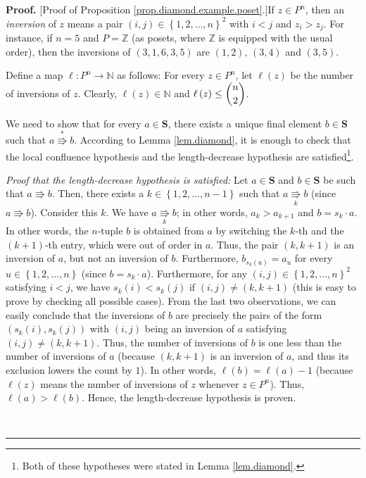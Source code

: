 \documentclass[numbers=enddot,12pt,final,onecolumn,notitlepage]{scrartcl}%
\theoremstyle{definition}
\newenvironment{proof}[1][Proof]{\noindent\textbf{#1.} }{\ \rule{0.5em}{0.5em}}
\newenvironment{vershort}{}{}
\begin{document}
\begin{proof}
[Proof of Proposition \ref{prop.diamond.example.poset}.]If $z\in P^{n}$, then
an \textit{inversion} of $z$ means a pair $\left(  i,j\right)  \in\left\{
1,2,\ldots,n\right\}  ^{2}$ with $i<j$ and $z_{i}>z_{j}$. For instance, if
$n=5$ and $P=\mathbb{Z}$ (as posets, where $\mathbb{Z}$ is equipped with the
usual order), then the inversions of $\left(  3,1,6,3,5\right)  $ are $\left(
1,2\right)  $, $\left(  3,4\right)  $ and $\left(  3,5\right)  $.

Define a map $\ell:P^{n}\rightarrow\mathbb{N}$ as follows: For every $z\in
P^{n}$, let $\ell\left(  z\right)  $ be the number of inversions of $z$.
Clearly, $\ell\left(  z\right)  \in\mathbb{N}$ and $\ell\left(  z\right)
\leq\dbinom{n}{2}$.

We need to show that for every $a\in\mathbf{S}$, there exists a unique final
element $b\in\mathbf{S}$ such that $a\overset{\ast}{\Rrightarrow}b$. According
to Lemma \ref{lem.diamond}, it is enough to check that the local confluence
hypothesis and the length-decrease hypothesis are satisfied\footnote{Both of
these hypotheses were stated in Lemma \ref{lem.diamond}.}.

\begin{vershort}
\textit{Proof that the length-decrease hypothesis is satisfied:} Let
$a\in\mathbf{S}$ and $b\in\mathbf{S}$ be such that $a\Rrightarrow b$. Then,
there exists a $k\in\left\{  1,2,\ldots,n-1\right\}  $ such that
$a\underset{k}{\Rrightarrow}b$ (since $a\Rrightarrow b$). Consider this $k$.
We have $a\underset{k}{\Rrightarrow}b$; in other words, $a_{k}>a_{k+1}$ and
$b=s_{k}\cdot a$. In other words, the $n$-tuple $b$ is obtained from $a$ by
switching the $k$-th and the $\left(  k+1\right)  $-th entry, which were out
of order in $a$. Thus, the pair $\left(  k,k+1\right)  $ is an inversion of
$a$, but not an inversion of $b$. Furthermore, $b_{s_{k}\left(  u\right)
}=a_{u}$ for every $u\in\left\{  1,2,\ldots,n\right\}  $ (since $b=s_{k}\cdot
a$). Furthermore, for any $\left(  i,j\right)  \in\left\{  1,2,\ldots
,n\right\}  ^{2}$ satisfying $i<j$, we have $s_{k}\left(  i\right)
<s_{k}\left(  j\right)  $ if $\left(  i,j\right)  \neq\left(  k,k+1\right)  $
(this is easy to prove by checking all possible cases). From the last two
observations, we can easily conclude that the inversions of $b$ are precisely
the pairs of the form $\left(  s_{k}\left(  i\right)  ,s_{k}\left(  j\right)
\right)  $ with $\left(  i,j\right)  $ being an inversion of $a$ satisfying
$\left(  i,j\right)  \neq\left(  k,k+1\right)  $. Thus, the number of
inversions of $b$ is one less than the number of inversions of $a$ (because
$\left(  k,k+1\right)  $ is an inversion of $a$, and thus its exclusion lowers
the count by $1$). In other words, $\ell\left(  b\right)  =\ell\left(
a\right)  -1$ (because $\ell\left(  z\right)  $ means the number of inversions
of $z$ whenever $z\in P^{n}$). Thus, $\ell\left(  a\right)  >\ell\left(
b\right)  $. Hence, the length-decrease hypothesis is proven.
\end{vershort}


\end{proof}
\end{document}
